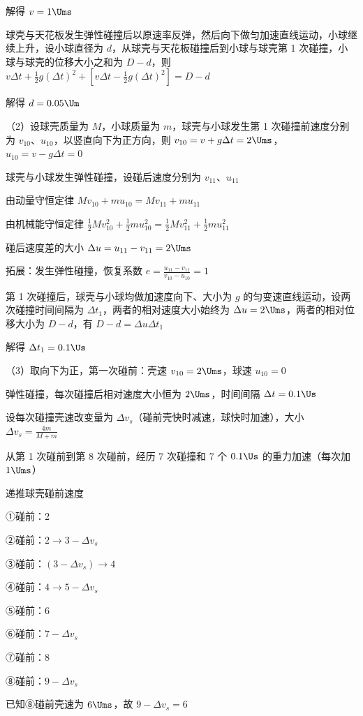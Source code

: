 \documentclass[\gkver]{gaokaozhenti}
\begin{document}
\begin{enumerate}
{解得 $v=1\Ums$

球壳与天花板发生弹性碰撞后以原速率反弹，然后向下做匀加速直线运动，小球继续上升，设小球直径为 $d$，从球壳与天花板碰撞后到小球与球壳第 1 次碰撞，小球与球壳的位移大小之和为 $D-d$，则 $v\Delta t+\frac{1}{2}g(\Delta t)^{2}+\left[v\Delta t-\frac{1}{2}g(\Delta t)^{2}\right]=D-d$

解得 $d=0.05\Um$

（2）设球壳质量为 $M$，小球质量为 $m$，球壳与小球发生第 1 次碰撞前速度分别为 $v_{10}$、$u_{10}$，以竖直向下为正方向，则 $v_{10}=v+g\Delta t=2\Ums$，$u_{10}=v-g\Delta t=0$

球壳与小球发生弹性碰撞，设碰后速度分别为 $v_{11}$、$u_{11}$

由动量守恒定律 $Mv_{10}+mu_{10}=Mv_{11}+mu_{11}$

由机械能守恒定律 $\frac{1}{2}Mv_{10}^{2}+\frac{1}{2}mu_{10}^{2}=\frac{1}{2}Mv_{11}^{2}+\frac{1}{2}mu_{11}^{2}$

碰后速度差的大小 $\Delta u=u_{11}-v_{11}=2\Ums$

拓展：发生弹性碰撞，恢复系数 $e=\frac{u_{11}-v_{11}}{v_{10}-u_{10}}=1$

第 1 次碰撞后，球壳与小球均做加速度向下、大小为 $g$ 的匀变速直线运动，设两次碰撞时间间隔为 $\Delta t_{1}$，两者的相对速度大小始终为 $\Delta u=2\Ums$，两者的相对位移大小为 $D-d$，有 $D-d=\Delta u\Delta t_{1}$

解得 $\Delta t_{1}=0.1\Us$

（3）取向下为正，第一次碰前：壳速 $v_{10}=2\Ums$，球速 $u_{10}=0$

弹性碰撞，每次碰撞后相对速度大小恒为 $2\Ums$，时间间隔 $\Delta t=0.1\Us$

设每次碰撞壳速改变量为 $\Delta v_{s}$（碰前壳快时减速，球快时加速），大小 $\Delta v_{s}=\frac{4m}{M+m}$

从第 1 次碰前到第 8 次碰前，经历 7 次碰撞和 7 个 $0.1\Us$ 的重力加速（每次加 $1\Ums$）

递推球壳碰前速度

①碰前：2

②碰前：$2\rightarrow3-\Delta v_{s}$

③碰前：$(3-\Delta v_{s})\rightarrow4$

④碰前：$4\rightarrow5-\Delta v_{s}$

⑤碰前：6

⑥碰前：$7-\Delta v_{s}$

⑦碰前：8

⑧碰前：$9-\Delta v_{s}$

已知⑧碰前壳速为 $6\Ums$，故 $9-\Delta v_{s}=6$

}
\end{enumerate}
\end{document}
